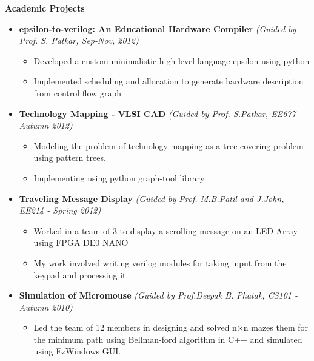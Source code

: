 \documentclass[a4paper,10pt]{article}
\newcommand{\isep}{-2 pt}
\newcommand{\resheading}[1]{{\small \colorbox{mygrey}{\begin{minipage}{0.975\textwidth}{\textbf{#1 \vphantom{p\^{E}}}}\end{minipage}}}}
\begin{document}
\resheading{\textbf{\large Academic Projects}}
\begin{itemize}
    \item \textbf{ epsilon-to-verilog: An Educational Hardware Compiler} \hfill \emph{(Guided by Prof. S. Patkar, Sep-Nov, 2012) }  \\[-0.6cm]
        \begin{itemize} \itemsep \isep
        \item Developed a custom minimalistic high level language epsilon using python
        \item Implemented scheduling and allocation to generate hardware description from control flow graph
   \end{itemize}
\item \textbf{Technology Mapping - VLSI CAD} \hfill  \hfill \emph{(Guided by Prof. S.Patkar, EE677 - Autumn 2012)} \\[-0.6cm]
    \begin{itemize} 
        \item Modeling the problem of technology mapping as a tree covering problem using pattern trees. \\[-0.6cm]
        \item Implementing using python graph-tool library \\[-0.6cm]
    \end{itemize}
\item \textbf{Traveling Message Display} \hfill \emph{(Guided by Prof. M.B.Patil and J.John, EE214 - Spring 2012)}\\[-0.6cm]
    \begin{itemize}
        \item Worked in a team of 3 to display a scrolling message on an LED Array using FPGA DE0 NANO\\[-0.6cm]
        \item My work involved writing verilog modules for taking input from the keypad and processing it.\\[-0.6cm]
    \end{itemize}
\item \textbf{Simulation of Micromouse} \hfill \emph{(Guided by Prof.Deepak B. Phatak, CS101 - Autumn 2010)}\\[-0.7cm]
	\begin{itemize}
	    \item Led the team of 12 members in designing and solved n$\times$n mazes them for the minimum path using Bellman-ford algorithm in C++ and simulated using EzWindows GUI.\\[-0.6cm]

\end{itemize}
\end{itemize}
\end{document}
